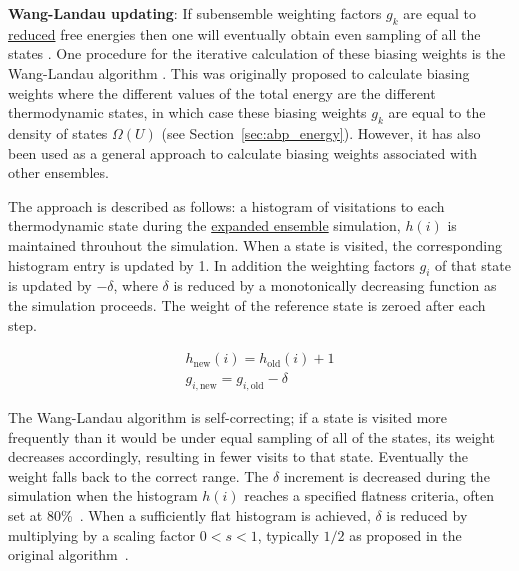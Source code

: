 \documentclass[9pt,review]{livecoms}
\begin{document}
\textbf{Wang-Landau updating}:
If subensemble weighting factors $g_k$ are equal to \hyperlink{ref:reduced} {reduced} free energies then one will eventually obtain even sampling of all the states
\cite{lyubartsev:jcp:1992:expanded-ensembles}.  One procedure for the
iterative calculation of these biasing weights is the Wang-Landau
algorithm \cite{wang-landau:prl:2001:wang-landau}. This was originally proposed to calculate biasing weights where the different values of the total energy are the different thermodynamic states, in which case these biasing weights $g_k$ are equal to the density of states $\Omega(U)$ (see Section~\ref{sec:abp_energy}).  However, it has also been used as a general approach to calculate biasing weights associated with other ensembles.

The approach is described as follows: a histogram of visitations to each thermodynamic state
during the \hyperlink{ref:ExpEns} {expanded ensemble} simulation, $h(i)$ is maintained
throuhout the simulation.  When a state is visited, the corresponding
histogram entry is updated by 1.  In addition the weighting factors $g_i$ of that state is updated by $-\delta$, where $\delta$ is reduced by a monotonically decreasing function as the simulation proceeds.  The
weight of the reference state is zeroed after each step.

\begin{eqnarray}
h_{\mathrm{new}}(i) = h_{\mathrm{old}}(i) + 1 \\
g_{i,\mathrm{new}} = g_{i,\mathrm{old}} - \delta
\label{eq:wang-landau}
\end{eqnarray}

The Wang-Landau algorithm is self-correcting; if a state is visited more frequently than it would be under equal sampling of all of the states, its weight decreases accordingly, resulting in fewer visits to that state.  Eventually the weight falls back to the correct range.  The $\delta$ increment is decreased during the simulation when the histogram $h(i)$ reaches a specified flatness criteria, often set at 80\%~\cite{wang-landau:prl:2001:wang-landau}.  When a sufficiently flat histogram is achieved, $\delta$ is reduced by multiplying by a scaling factor $0<s<1$, typically $1/2$ as proposed in the original algorithm~\cite{wang-landau:prl:2001:wang-landau}.
\end{document}
